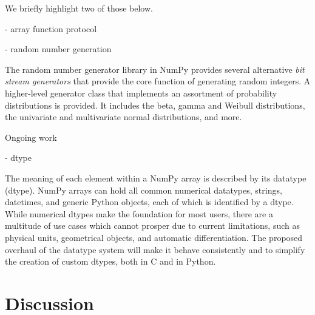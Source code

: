 We briefly highlight two of those below.

- array function protocol

- random number generation

The random number generator library in NumPy provides several alternative
\emph{bit stream generators} that provide the core function of generating
random integers.
A higher-level generator class that implements an assortment of
probability distributions is provided. It includes the beta, gamma
and Weibull distributions, the univariate and multivariate normal
distributions, and more.

Ongoing work

- dtype

The meaning of each element within a NumPy array is described by its
datatype (dtype). NumPy arrays can hold all common numerical
datatypes, strings, datetimes, and generic Python objects, each of
which is identified by a dtype.
While numerical dtypes make the foundation for most users,
there are a multitude of use cases which cannot prosper due to current
limitations, such as physical units\cite{astropy,Goldbaum2018,pint},
geometrical objects\cite{pygeos}, and automatic
differentiation\cite{pyadolc}.
The proposed overhaul of the datatype system will make it behave consistently and
to simplify the creation of custom dtypes, both in C and in Python.

\section*{Discussion}
